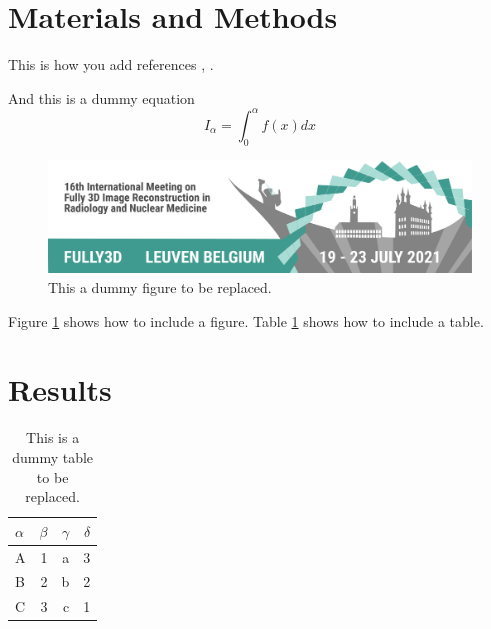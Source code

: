 \documentclass[11pt,twocolumn,twoside]{article}
\begin{document}
\section{Materials and Methods}

This is how you add references \cite{Deen2019}, \cite{Doe2020}.

And this is a dummy equation
\begin{equation}
I_\alpha = \int_0^\alpha f(x) dx
\end{equation}

\begin{figure}
  \centering
  \includegraphics[width=1.0\textwidth]{./fig1.pdf}
  \caption{This a dummy figure to be replaced.}
  \label{fig:dummyfigure}
\end{figure}

Figure \ref{fig:dummyfigure} shows how to include a figure.
Table \ref{tab:dummytable} shows how to include a table.

\bigskip

\lipsum[2-7]


\section{Results}

\begin{table}
  \centering
  \sffamily
  \begin{tabular}{lrrr}
  \toprule
  $\alpha$   & $\beta$ & $\gamma$ & $\delta$ \\
  \midrule
  A          & 1       & a        & 3        \\
  B          & 2       & b        & 2        \\
  C          & 3       & c        & 1        \\
  \bottomrule
  \end{tabular}
  \caption{This is a dummy table to be replaced.}
  \label{tab:dummytable}
\end{table}
\end{document}
